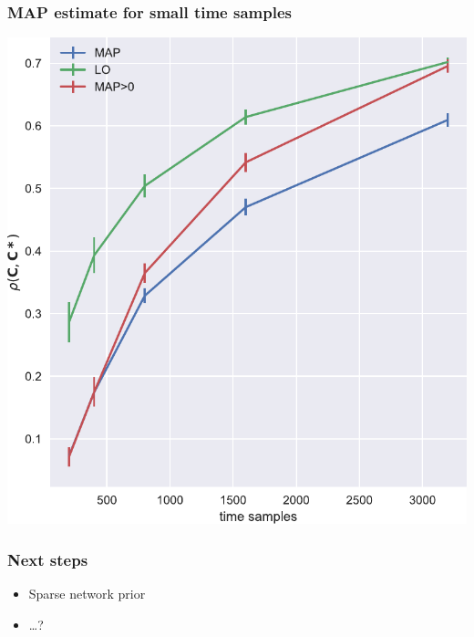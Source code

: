 \documentclass[final]{beamer}
\begin{document}
\begin{frame}
\frametitle{MAP estimate for small time samples}
\begin{center}
\includegraphics[width=0.65\columnwidth]{similarity_varyingT3}
\end{center}
\end{frame}

\begin{frame}
\frametitle{Next steps}
	\begin{itemize}
		\item Sparse network prior
		\item \ldots?
	\end{itemize}
\end{frame}
\end{document}
